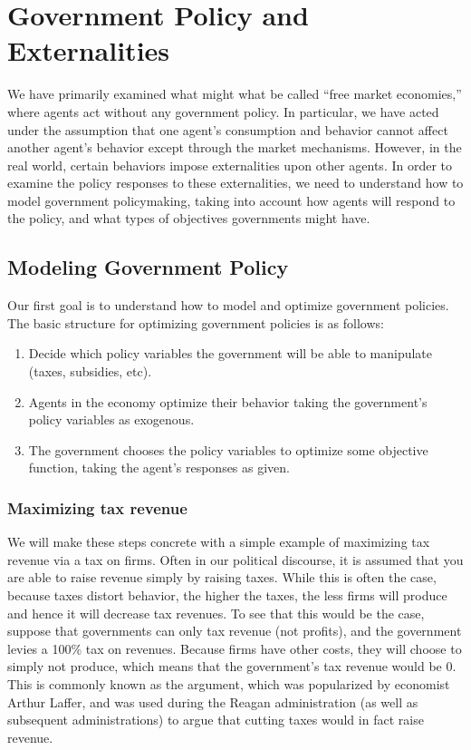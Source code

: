 \chapter{Government Policy and Externalities}
We have primarily examined what might what be called ``free market economies,'' where agents act without any government policy. In particular, we have acted under the assumption that one agent's consumption and behavior cannot affect another agent's behavior except through the market mechanisms. However, in the real world, certain behaviors impose externalities upon other agents. In order to examine the policy responses to these externalities, we need to understand how to model government policymaking, taking into account how agents will respond to the policy, and what types of objectives governments might have. 


\section{Modeling Government Policy} \label{sec:govt_policy}
Our first goal is to understand how to model and optimize government policies. The basic structure for optimizing government policies is as follows:
\begin{enumerate}
    \item Decide which policy variables the government will be able to manipulate (taxes, subsidies, etc).
    \item Agents in the economy optimize their behavior taking the government's policy variables as exogenous. 
    \item The government chooses the policy variables to optimize some objective function, taking the agent's responses as given. 
\end{enumerate}

\subsection*{Maximizing tax revenue}
We will make these steps concrete with a simple example of maximizing tax revenue via a tax on firms. Often in our political discourse, it is assumed that you are able to raise revenue simply by raising taxes. While this is often the case, because taxes distort behavior, the higher the taxes, the less firms will produce and hence it will decrease tax revenues. To see that this would be the case, suppose that governments can only tax revenue (not profits), and the government levies a 100\% tax on revenues. Because firms have other costs, they will choose to simply not produce, which means that the government's tax revenue would be 0. This is commonly known as the  argument, which was popularized by economist Arthur Laffer, and was used during the Reagan administration (as well as subsequent administrations) to argue that cutting taxes would in fact raise revenue. 

